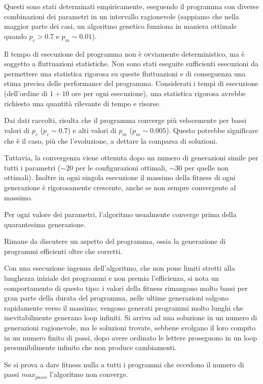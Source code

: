 \documentclass[paper=a4, fontsize=11pt]{scrartcl}
\numberwithin{equation}{section}		%
\numberwithin{figure}{section}			%
\numberwithin{table}{section}				%
\begin{document}
Questi sono stati determinati empiricamente, eseguendo il programma con diverse combinazioni dei parametri in un intervallo ragionevole (sappiamo che nella maggior parte dei casi, un algoritmo genetico funziona in maniera ottimale quando $p_c  > 0.7$ e $p_m \sim 0.01$).

Il tempo di esecuzione del programma non è ovviamente deterministico, ma è soggetto a fluttuazioni statistiche. Non sono stati eseguite sufficienti esecuzioni da permettere una statistica rigorosa su queste fluttuazioni e di conseguenza una stima precisa delle performance del programma. Considerati i tempi di esecuzione (dell'ordine di $1 \div 10$ ore per ogni esecuzione), una statistica rigorosa  avrebbe richiesto una quantità rilevante di tempo e risorse.

Dai dati raccolti, risulta che il programma converge più velocemente per bassi valori di $p_c$ ($p_c \sim 0.7$) e alti valori di $p_m$ ($p_m \sim 0.005$). Questo potrebbe significare che è il caso, più che l'evoluzione, a dettare la comparsa di soluzioni. 

Tuttavia, la convergenza  viene ottenuta dopo un numero di generazioni simile per tutti i parametri ($ \sim 20$ per le configurazioni ottimali, $\sim 30$ per quelle non ottimali). Inoltre in ogni singola esecuzione il massimo della fitness di ogni generazione è rigorosamente crescente, anche se non sempre convergente al massimo.


Per ogni valore dei parametri, l'algoritmo usualmente converge prima della quarantesima generazione. 

Rimane da discutere un aspetto del programma, ossia la generazione di programmi efficienti oltre che corretti.

Con una esecuzione ingenua dell'algoritmo, che non pone limiti stretti alla lunghezza iniziale dei programmi e non premia l'efficienza,  si nota un comportamento di questo tipo:
i valori della fitness rimangono molto bassi per gran parte della durata del programma, nelle ultime generazioni salgono rapidamente verso il massimo; vengono generati programmi molto lunghi che inevitabilmente generano loop infiniti. Si arriva ad una soluzione in un numero di generazioni ragionevole, ma le soluzioni trovate, sebbene svolgano il loro compito in un numero finito di passi, dopo avere ordinato le lettere proseguono in un loop presumibilmente infinito che non produce cambiamenti.

Se si prova a dare fitness nulla a tutti i programmi che eccedono il numero di passi $max_{passi}$ l'algoritmo non converge.
\end{document}
